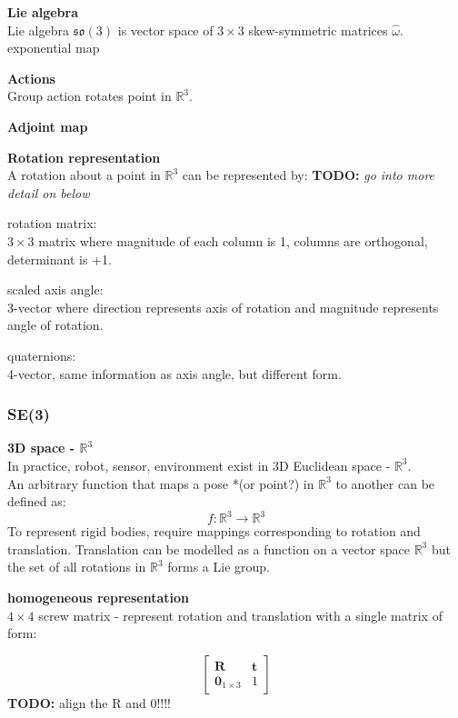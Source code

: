		\textbf{Lie algebra}\\
		Lie algebra $\mathfrak{so}(3)$ is vector space of $3 \times 3$ skew-symmetric matrices $\hat{\omega}$.
		exponential map		
		
		\textbf{Actions}\\
		Group action rotates point in $\mathbb{R}^3$.
		
		\textbf{Adjoint map}
		
		\textbf{Rotation representation}\\		
		A rotation about a point in $\mathbb{R}^3$ can be represented by: \textbf{TODO:} \textit{go into more detail on below}
		
		rotation matrix:\\
		$3 \times 3$ matrix where magnitude of each column is 1, columns are orthogonal, determinant is +1.
		
		scaled axis angle:\\
		3-vector where direction represents axis of rotation and magnitude represents angle of rotation.		
		
		quaternions:\\
		4-vector, same information as axis angle, but different form.
		
	\subsubsection{\textbf{SE}(3)}		
		\textbf{3D space - $\mathbb{R}^3$}\\
		In practice, robot, sensor, environment exist in 3D Euclidean space - $\mathbb{R}^3$.\\
		An arbitrary function that maps a pose *(or point?) in $\mathbb{R}^3$ to another can be defined as:
		\begin{equation}
		f: \mathbb{R}^3 \rightarrow \mathbb{R}^3
		\end{equation}
		To represent rigid bodies, require mappings corresponding to rotation and translation. Translation can be modelled as a function on a vector space $\mathbb{R}^3$ but the set of all rotations in $\mathbb{R}^3$ forms a Lie group. 

		\textbf{homogeneous representation}\\
		$4 \times 4$ screw matrix - represent rotation and translation with a single matrix of form:
		
		\begin{equation}
				\begin{bmatrix}
				  \mathbf{R}	&	\mathbf{t} \\
				  \textbf{0}_{1 \times 3}		& 	1 
				\end{bmatrix}
		\end{equation}
		\textbf{TODO:} align the R and 0!!!!


